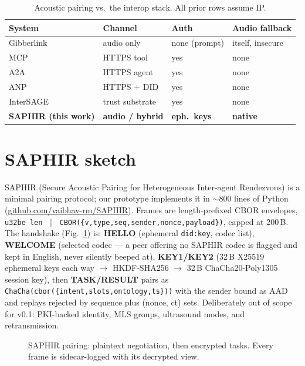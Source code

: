 \documentclass[10pt,twocolumn]{article}
\begin{document}
\begin{table}[h]
\centering\small
\caption{Acoustic pairing vs.\ the interop stack. All prior rows assume IP.}
\label{tab:stack}
\begin{tabular}{@{}llll@{}}
\toprule
System & Channel & Auth & Audio fallback \\
\midrule
Gibberlink & audio only & none (prompt) & itself, insecure \\
MCP & HTTPS tool & yes & none \\
A2A & HTTPS agent & yes & none \\
ANP & HTTPS + DID & yes & none \\
InterSAGE & trust substrate & yes & none \\
\textbf{SAPHIR (this work)} & \textbf{audio / hybrid} & \textbf{eph.\ keys} & \textbf{native} \\
\bottomrule
\end{tabular}
\end{table}

\section{SAPHIR sketch}
SAPHIR (Secure Acoustic Pairing for Heterogeneous Inter-agent Rendezvous) is a
minimal pairing protocol; our prototype implements it in $\sim$800 lines of
Python (\url{github.com/vaibhav-rm/SAPHIR}).
Frames are length-prefixed CBOR envelopes,
\texttt{u32be len $\parallel$ CBOR(\{v,type,seq,sender,nonce,payload\})}, capped
at 200\,B. The handshake (Fig.~\ref{fig:hs}) is: \textbf{HELLO} (ephemeral
\texttt{did:key}, codec list), \textbf{WELCOME} (selected codec --- a peer
offering no SAPHIR codec is flagged and kept in English, never silently
beeped at), \textbf{KEY1/KEY2} (32\,B X25519 ephemeral keys each way
$\to$ HKDF-SHA256 $\to$ 32\,B ChaCha20-Poly1305 session key), then
\textbf{TASK/RESULT} pairs as \texttt{ChaCha(cbor(\{intent,slots,ontology,ts\}))}
with the sender bound as AAD and replays rejected by sequence plus (nonce, ct)
sets. Deliberately out of scope for v0.1: PKI-backed identity, MLS groups,
ultrasound modes, and retransmission.

\begin{figure}[h]
\centering
{}
\caption{SAPHIR pairing: plaintext negotiation, then encrypted tasks. Every frame is sidecar-logged with its decrypted view.}
\label{fig:hs}
\end{figure}
\end{document}

